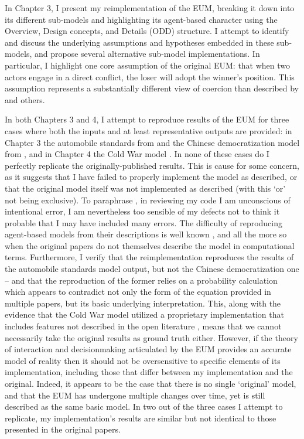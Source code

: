 In Chapter 3, I present my reimplementation of the EUM, breaking it down into its different sub-models and highlighting its agent-based character using the \citet{grimm_2006} Overview, Design concepts, and Details (ODD) structure. I attempt to identify and discuss the underlying assumptions and hypotheses embedded in these sub-models, and propose several alternative sub-model implementations. In particular, I highlight one core assumption of the original EUM: that when two actors engage in a direct conflict, the loser will adopt the winner's position. This assumption represents a substantially different view of coercion than described by \citet{schelling_1966} and others.

In both Chapters 3 and 4, I attempt to reproduce results of the EUM for three cases where both the inputs and at least representative outputs are provided: in Chapter 3 the automobile standards from \citet{bdm_1994} and the Chinese democratization model from \citet{bdm_2002}, and in Chapter 4 the Cold War model \citep{bdm_1998}. In none of these cases do I perfectly replicate the originally-published results. This is cause for some concern, as it suggests that I have failed to properly implement the model as described, or that the original model itself was not implemented as described (with this `or' not being exclusive). To paraphrase \citet{washington_1796}, in reviewing my code I am unconscious of intentional error, I am nevertheless too sensible of my defects not to think it probable that I may have included many errors. The difficulty of reproducing agent-based models from their descriptions is well known \citep{axtell_1996,rand_2007,edmonds_2003}, and all the more so when the original papers do not themselves describe the model in computational terms. Furthermore, I verify that the \citet{scholz_2011} reimplementation reproduces the results of the automobile standards model output, but not the Chinese democratization one -- and that the reproduction of the former relies on a probability calculation which appears to contradict not only the form of the equation provided in multiple papers, but its basic underlying interpretation. This, along with the evidence that the Cold War model utilized a proprietary implementation that includes features not described in the open literature \citep{dii_2011}, means that we cannot necessarily take the original results as ground truth either. However, if the theory of interaction and decisionmaking articulated by the EUM provides an accurate model of reality then it should not be oversensitive to specific elements of its implementation, including those that differ between my implementation and the original. Indeed, it appears to be the case that there is no single `original' model, and that the EUM has undergone multiple changes over time, yet is still described as the same basic model. In two out of the three cases I attempt to replicate, my implementation's results are similar but not identical to those presented in the original papers.

